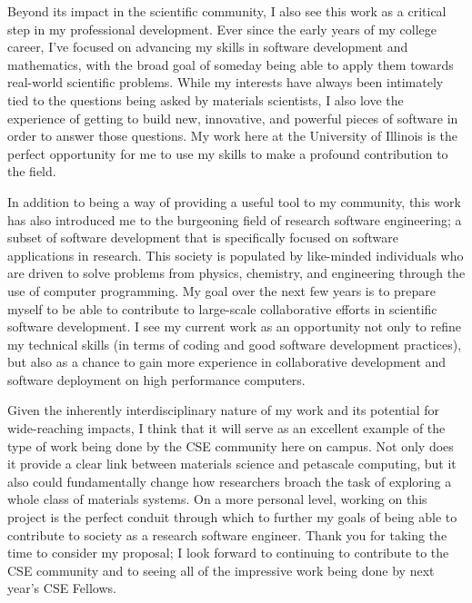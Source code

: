 \documentclass{article}
\begin{document}
Beyond its impact in the scientific community, I also see this work as a critical step in my professional development. Ever since the early years of my college career, I've focused on advancing my skills in software development and mathematics, with the broad goal of someday being able to apply them towards real-world scientific problems. While my interests have always been intimately tied to the questions being asked by materials scientists, I also love the experience of getting to build new, innovative, and powerful pieces of software in order to answer those questions. My work here at the University of Illinois is the perfect opportunity for me to use my skills to make a profound contribution to the field.

In addition to being a way of providing a useful tool to my community, this work has also introduced me to the burgeoning field of research software engineering; a subset of software development that is specifically focused on software applications in research. This society is populated by like-minded individuals who are driven to solve problems from physics, chemistry, and engineering through the use of computer programming. My goal over the next few years is to prepare myself to be able to contribute to large-scale collaborative efforts in scientific software development. I see my current work as an opportunity not only to refine my technical skills (in terms of coding and good software development practices), but also as a chance to gain more experience in collaborative development and software deployment on high performance computers.

Given the inherently interdisciplinary nature of my work and its potential for wide-reaching impacts, I think that it will serve as an excellent example of the type of work being done by the CSE community here on campus. Not only does it provide a clear link between materials science and petascale computing, but it also could fundamentally change how researchers broach the task of exploring a whole class of materials systems. On a more personal level, working on this project is the perfect conduit through which to further my goals of being able to contribute to society as a research software engineer. Thank you for taking the time to consider my proposal; I look forward to continuing to contribute to the CSE community and to seeing all of the impressive work being done by next year's CSE Fellows.



\end{document}

